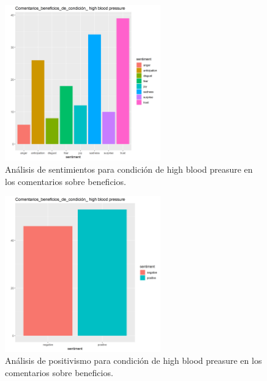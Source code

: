 \documentclass[spanish,]{article}
\begin{document}
\begin{figure}[h]
    \centering
    \includegraphics[width=0.6\textwidth]{figuras/sentimientos/Ablood1.png}
    \caption{Análisis de sentimientos para condición de high blood preasure en los comentarios sobre beneficios.}
    \label{fig:sentimientos:13}
\end{figure}

\begin{figure}[h]
    \centering
    \includegraphics[width=0.6\textwidth]{figuras/sentimientos/Ablood2.png}
    \caption{Análisis de positivismo para condición de high blood preasure en los comentarios sobre beneficios.}
    \label{fig:sentimientos:14}
\end{figure}
\end{document}
